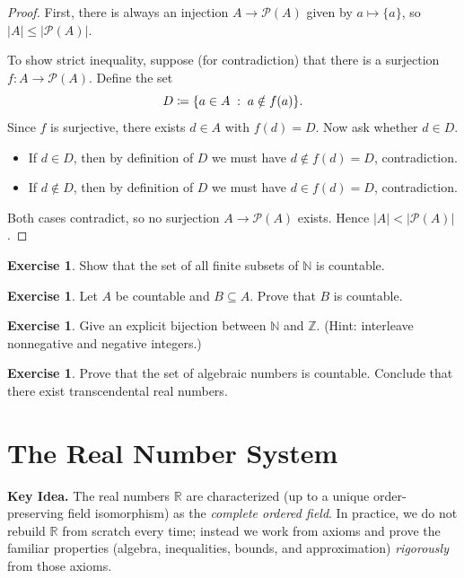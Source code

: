 \documentclass[12pt]{article}
\numberwithin{equation}{section}
\def\abs#1{|#1|}
\newcommand{\RR}{\mathbb{R}}
\newcommand{\ZZ}{\mathbb{Z}}
\newcommand{\NN}{\mathbb{N}}
\DeclarePairedDelimiter{\abs}{\lvert}{\rvert}
\DeclarePairedDelimiter{\set}{\{}{\}}
\newcommand{\st}{\;:\;}                      %
\theoremstyle{plain}
\theoremstyle{definition}
\newtheorem{exercise}[theorem]{Exercise}
\theoremstyle{remark}
\newenvironment{keyidea}{\begin{tcolorbox}\textbf{Key Idea.}}{\end{tcolorbox}}
\begin{document}
\begin{proof}
First, there is always an injection $A\to\mathcal{P}(A)$ given by $a\mapsto\{a\}$, so $\abs{A}\le \abs{\mathcal{P}(A)}$.

To show strict inequality, suppose (for contradiction) that there is a surjection $f:A\to \mathcal{P}(A)$.  
Define the set
\[
D \coloneqq \set*{a\in A \st a\notin f(a)}.
\]
Since $f$ is surjective, there exists $d\in A$ with $f(d)=D$. Now ask whether $d\in D$.

\begin{itemize}
  \item If $d\in D$, then by definition of $D$ we must have $d\notin f(d)=D$, contradiction.
  \item If $d\notin D$, then by definition of $D$ we must have $d\in f(d)=D$, contradiction.
\end{itemize}

Both cases contradict, so no surjection $A\to\mathcal{P}(A)$ exists. Hence $\abs{A}<\abs{\mathcal{P}(A)}$.
\end{proof}

\begin{exercise}
Show that the set of all finite subsets of $\NN$ is countable.
\end{exercise}

\begin{exercise}
Let $A$ be countable and $B\subseteq A$. Prove that $B$ is countable.
\end{exercise}

\begin{exercise}
Give an explicit bijection between $\NN$ and $\ZZ$. (Hint: interleave nonnegative and negative integers.)
\end{exercise}

\begin{exercise}
Prove that the set of algebraic numbers is countable. Conclude that there exist transcendental real numbers.
\end{exercise}

\newpage


\section{The Real Number System}

\begin{keyidea}
The real numbers $\RR$ are characterized (up to a unique order-preserving field isomorphism) as the \emph{complete ordered field}.
In practice, we do not rebuild $\RR$ from scratch every time; instead we work from axioms and prove the familiar properties (algebra, inequalities, bounds, and approximation) \emph{rigorously} from those axioms.
\end{keyidea}
\end{document}

